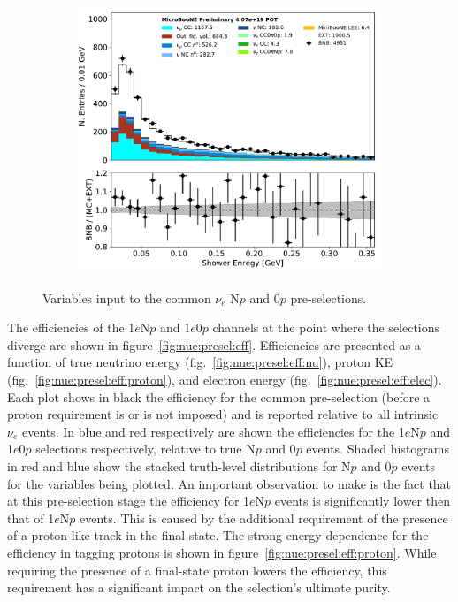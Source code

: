 \documentclass[a4paper]{article}
\begin{document}
\begin{figure}[H]
\begin{center}
\begin{subfigure}[b]{0.3\textwidth}
    \caption{\label{fig:nue:presel:ntrack} }
    \end{subfigure}
    \begin{subfigure}[b]{0.3\textwidth}
    \centering
    \includegraphics[width=1.00\textwidth]{nueselection/shr_energy_tot_cali_01132020_RUN1.pdf}
    \caption{\label{fig:nue:presel:shrenergy} }
    \end{subfigure}
\caption{\label{fig:nue:presel}Variables input to the common $\nu_e$ N$p$ and 0$p$ pre-selections.}
\end{center}
\end{figure}

\par The efficiencies of the 1$e$N$p$ and 1$e$0$p$ channels at the point where the selections diverge are shown in figure~\ref{fig:nue:presel:eff}. Efficiencies are presented as a function of true neutrino energy (fig.~\ref{fig:nue:presel:eff:nu}), proton KE (fig.~\ref{fig:nue:presel:eff:proton}), and electron energy (fig.~\ref{fig:nue:presel:eff:elec}). Each plot shows in black the efficiency for the common pre-selection (before a proton requirement is or is not imposed) and is reported relative to all intrinsic $\nu_e$ events. In blue and red respectively are shown the efficiencies for the  1$e$N$p$ and 1$e$0$p$ selections respectively, relative to true N$p$ and 0$p$ events. Shaded histograms in red and blue show the stacked truth-level distributions for N$p$ and 0$p$ events for the variables being plotted. An important observation to make is the fact that at this pre-selection stage the efficiency for 1$e$N$p$ events is significantly lower then that of 1$e$N$p$ events. This is caused by the additional requirement of the presence of a proton-like track in the final state. The strong energy dependence for the efficiency in tagging protons is shown in figure~\ref{fig:nue:presel:eff:proton}. While requiring the presence of a final-state proton lowers the efficiency, this requirement has a significant impact on the selection's ultimate purity.
\end{document}
